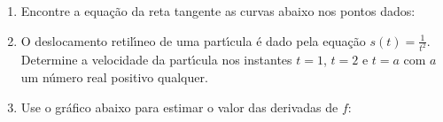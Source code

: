 \documentclass[a4paper,5pt]{amsbook}
\newcommand{\ds}{\displaystyle}
\begin{document}
\vspace{1cm}
\begin{enumerate}
    \vspace{0.5cm}
    \item Encontre a equa\c{c}\~ao da reta tangente as curvas abaixo nos pontos
        dados:

        \noindent{}

    \vspace{0.5cm}
    \item O deslocamento retil\'{\i}neo de uma part\'{\i}cula \'e dado pela equa\c{c}\~ao
        $s(t)=\ds\frac{1}{t^2}$. Determine a velocidade da part\'{\i}cula nos
        instantes $t=1$, $t=2$ e $t=a$ com $a$ um n\'umero real positivo
        qualquer.

    \vspace{0.5cm}
    \item Use o gr\'afico abaixo para estimar o valor das derivadas de $f$:

        \noindent{}


\end{enumerate}
\end{document}
